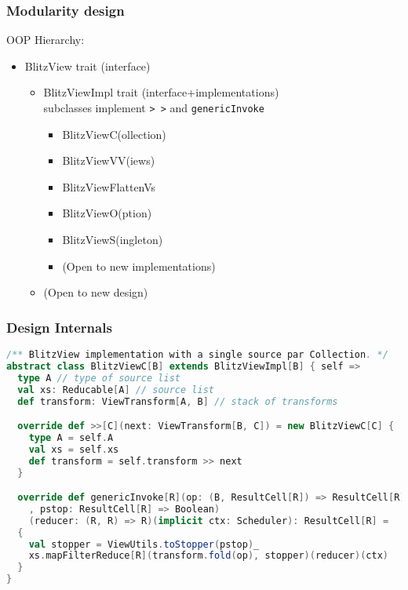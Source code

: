 \documentclass[12pt]{beamer}
\begin{document}
\begin{frame}
    \frametitle{Modularity design}
    OOP Hierarchy:
    \begin{itemize}
        \item BlitzView trait (interface)
        \begin{itemize}
            \item BlitzViewImpl trait (interface+implementations)
             \\ subclasses implement {\tt >\,>} and {\tt genericInvoke}
            \begin{itemize}
                \item BlitzViewC(ollection)
                \item BlitzViewVV(iews)
                \item BlitzViewFlattenVs
                \item BlitzViewO(ption)
                \item BlitzViewS(ingleton)
                \item (Open to new implementations)
            \end{itemize}
        \item (Open to new design)
        \end{itemize}
    \end{itemize}
\end{frame}

\begin{frame}[fragile]
    \frametitle{Design Internals}
    \begin{lstlisting}[language=scala, basicstyle=\tiny]
/** BlitzView implementation with a single source par Collection. */
abstract class BlitzViewC[B] extends BlitzViewImpl[B] { self =>
  type A // type of source list
  val xs: Reducable[A] // source list
  def transform: ViewTransform[A, B] // stack of transforms

  override def >>[C](next: ViewTransform[B, C]) = new BlitzViewC[C] {
    type A = self.A
    val xs = self.xs
    def transform = self.transform >> next
  }

  override def genericInvoke[R](op: (B, ResultCell[R]) => ResultCell[R]
    , pstop: ResultCell[R] => Boolean)
    (reducer: (R, R) => R)(implicit ctx: Scheduler): ResultCell[R] =
  {
    val stopper = ViewUtils.toStopper(pstop)_
    xs.mapFilterReduce[R](transform.fold(op), stopper)(reducer)(ctx)
  }
}
    \end{lstlisting}
\end{frame}
\end{document}
